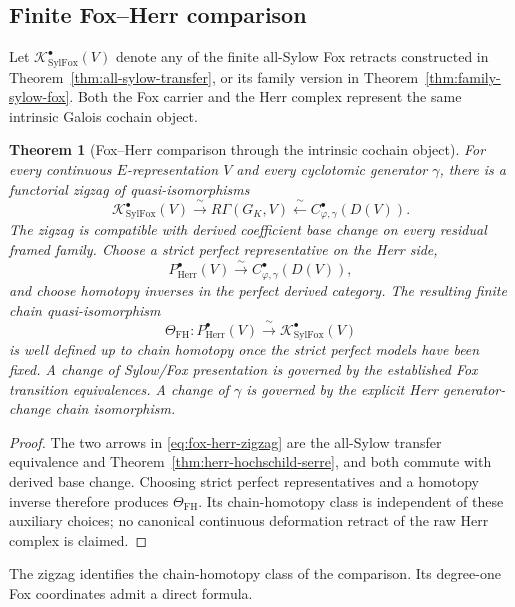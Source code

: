 \documentclass[11pt]{article}
\newtheorem{theorem}{Theorem}[section]
\theoremstyle{definition}
\begin{document}
\subsection{Finite Fox--Herr comparison}

Let $\mathcal K_{\mathrm{SylFox}}^\bullet(V)$ denote any of the finite all-Sylow Fox retracts constructed in Theorem~\ref{thm:all-sylow-transfer}, or its family version in Theorem~\ref{thm:family-sylow-fox}.  Both the Fox carrier and the Herr complex represent the same intrinsic Galois cochain object.

\begin{theorem}[Fox--Herr comparison through the intrinsic cochain object]\label{thm:fox-herr-zigzag}
For every continuous $E$-representation $V$ and every cyclotomic generator $\gamma$, there is a functorial zigzag of quasi-isomorphisms
\begin{equation}\label{eq:fox-herr-zigzag}
 \mathcal K_{\mathrm{SylFox}}^\bullet(V)
 \xrightarrow{\ \sim\ }
 R\Gamma(G_K,V)
 \xleftarrow{\ \sim\ }
 C_{\varphi,\gamma}^\bullet(D(V)).
\end{equation}
The zigzag is compatible with derived coefficient base change on every residual framed family.  Choose a strict perfect representative on the Herr side,
\[
 P_{\mathrm{Herr}}^\bullet(V)
 \xrightarrow{\ \sim\ }
 C_{\varphi,\gamma}^\bullet(D(V)),
\]
and choose homotopy inverses in the perfect derived category.  The resulting finite chain quasi-isomorphism
\[
 \Theta_{\mathrm{FH}}:
 P_{\mathrm{Herr}}^\bullet(V)
 \xrightarrow{\ \sim\ }
 \mathcal K_{\mathrm{SylFox}}^\bullet(V)
\]
is well defined up to chain homotopy once the strict perfect models have been fixed.  A change of Sylow/Fox presentation is governed by the established Fox transition equivalences.  A change of $\gamma$ is governed by the explicit Herr generator-change chain isomorphism.
\end{theorem}

\begin{proof}
The two arrows in \eqref{eq:fox-herr-zigzag} are the all-Sylow transfer equivalence and Theorem~\ref{thm:herr-hochschild-serre}, and both commute with derived base change.  Choosing strict perfect representatives and a homotopy inverse therefore produces $\Theta_{\mathrm{FH}}$.  Its chain-homotopy class is independent of these auxiliary choices; no canonical continuous deformation retract of the raw Herr complex is claimed.
\end{proof}

The zigzag identifies the chain-homotopy class of the comparison.  Its degree-one Fox coordinates admit a direct formula.
\end{document}
